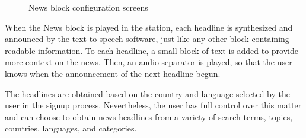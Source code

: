 \begin{figure}[htbp]
	\centering
	 \qquad
	 \qquad
	\caption{News block configuration screens}
	\label{fig:mfp1}
\end{figure}


When the News block is played in the station, each headline is synthesized and announced by the text-to-speech software, just like any other block containing readable information. To each headline, a small block of text is added to provide more context on the news. Then, an audio separator is played, so that the user knows when the announcement of the next headline begun.

The headlines are obtained based on the country and language selected by the user in the signup process. Nevertheless, the user has full control over this matter and can choose to obtain news headlines from a variety of search terms, topics, countries, languages, and categories.



